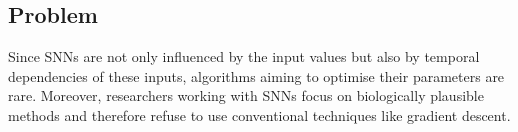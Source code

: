 \subsection{Problem}
\label{subsec:problem}

Since \acp{SNN} are not only influenced by the input values but also by temporal dependencies of these inputs, algorithms aiming to optimise their parameters are rare.
Moreover, researchers working with \acp{SNN} focus on biologically plausible methods and therefore refuse to use conventional techniques like gradient descent.